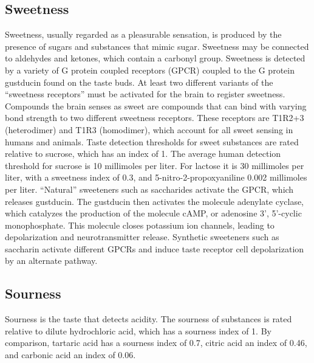 \hypertarget{sweetness}{%
\subsection{Sweetness}\label{sweetness}}

Sweetness, usually regarded as a pleasurable sensation, is produced by the presence of sugars and substances that mimic sugar. Sweetness may be connected to aldehydes and ketones, which contain a carbonyl group. Sweetness is detected by a variety of G protein coupled receptors (GPCR) coupled to the G protein gustducin found on the taste buds. At least two different variants of the ``sweetness receptors'' must be activated for the brain to register sweetness. Compounds the brain senses as sweet are compounds that can bind with varying bond strength to two different sweetness receptors. These receptors are T1R2+3 (heterodimer) and T1R3 (homodimer), which account for all sweet sensing in humans and animals. Taste detection thresholds for sweet substances are rated relative to sucrose, which has an index of 1. The average human detection threshold for sucrose is 10 millimoles per liter. For lactose it is 30 millimoles per liter, with a sweetness index of 0.3, and 5-nitro-2-propoxyaniline 0.002 millimoles per liter. ``Natural'' sweeteners such as saccharides activate the GPCR, which releases gustducin. The gustducin then activates the molecule adenylate cyclase, which catalyzes the production of the molecule cAMP, or adenosine 3', 5'-cyclic monophosphate. This molecule closes potassium ion channels, leading to depolarization and neurotransmitter release. Synthetic sweeteners such as saccharin activate different GPCRs and induce taste receptor cell depolarization by an alternate pathway.

\hypertarget{sourness}{%
\subsection{Sourness}\label{sourness}}

Sourness is the taste that detects acidity. The sourness of substances is rated relative to dilute hydrochloric acid, which has a sourness index of 1. By comparison, tartaric acid has a sourness index of 0.7, citric acid an index of 0.46, and carbonic acid an index of 0.06.

